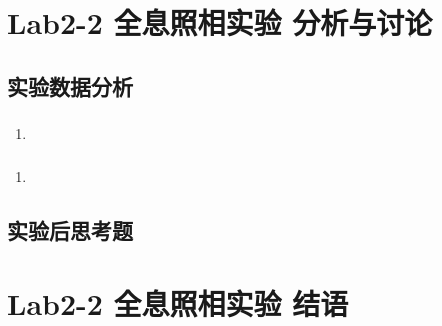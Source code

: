 \documentclass[dvipsnames, svgnames,a4paper,11pt]{article}
\begin{document}
	\section{Lab2-2 全息照相实验 \quad\heiti 分析与讨论}
	
	\subsection{实验数据分析}
	
	\subsubsection{}
	\begin{enumerate}
		\item 
	\end{enumerate}
	
	\subsubsection{}
	\begin{enumerate}
		\item 
	\end{enumerate}
	
	\subsubsection{}
	
	
	\subsection{实验后思考题}
	
	\begin{question}
		
	\end{question}
	
	\begin{question}
		
	\end{question}
	
	\begin{question}
		
	\end{question}
	
	
	
	\clearpage
	
	\section{Lab2-2 全息照相实验 \quad\heiti 结语}
	
\end{document}
